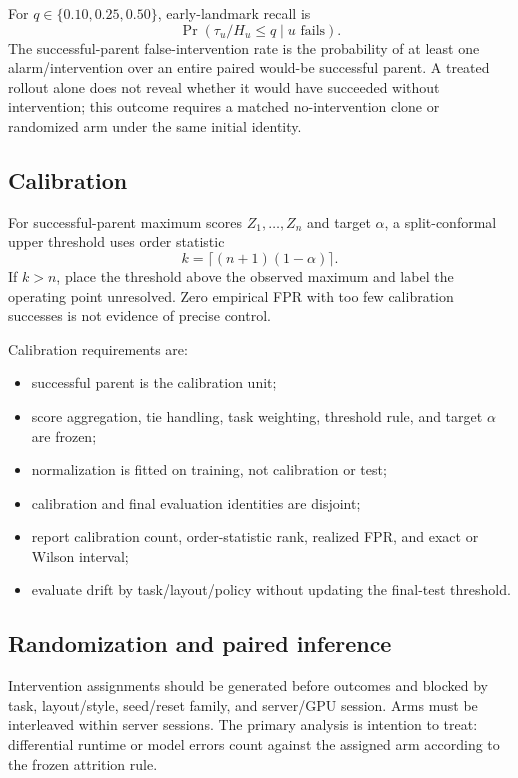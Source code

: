 For $q\in\{0.10,0.25,0.50\}$, early-landmark recall is
\begin{equation}
  \Pr(\tau_u/H_u\le q\mid u\text{ fails}).
\end{equation}
The successful-parent false-intervention rate is the probability of at least one alarm/intervention over an entire paired would-be successful parent. A treated rollout alone does not reveal whether it would have succeeded without intervention; this outcome requires a matched no-intervention clone or randomized arm under the same initial identity.

\subsection{Calibration}

For successful-parent maximum scores $Z_1,\ldots,Z_n$ and target $\alpha$, a split-conformal upper threshold uses order statistic
\begin{equation}
  k=\lceil(n+1)(1-\alpha)\rceil.
\end{equation}
If $k>n$, place the threshold above the observed maximum and label the operating point unresolved. Zero empirical FPR with too few calibration successes is not evidence of precise control.

\pagebreak[3]
Calibration requirements are:
\begin{itemize}
  \item successful parent is the calibration unit;
  \item score aggregation, tie handling, task weighting, threshold rule, and target $\alpha$ are frozen;
  \item normalization is fitted on training, not calibration or test;
  \item calibration and final evaluation identities are disjoint;
  \item report calibration count, order-statistic rank, realized FPR, and exact or Wilson interval;
  \item evaluate drift by task/layout/policy without updating the final-test threshold.
\end{itemize}

\subsection{Randomization and paired inference}

Intervention assignments should be generated before outcomes and blocked by task, layout/style, seed/reset family, and server/GPU session. Arms must be interleaved within server sessions. The primary analysis is intention to treat: differential runtime or model errors count against the assigned arm according to the frozen attrition rule.

